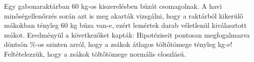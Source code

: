 Egy gabonaraktárban 60 kg-os kiszerelésben búzát csomagolnak. A havi
minőségellenőrzés során azt is meg akarták vizsgálni, hogy a raktárból 
kikerülő zsákokban tényleg 60 kg búza van-e, ezért lemértek 
darab véletlenül kiválasztott zsákot. Eredményül a következőket kapták:
Hipotéziseit pontosan megfogalmazva döntsön \%-os szinten arról, 
hogy a zsákok átlagos töltőtömege tényleg  kg-e! Feltételezzük, 
hogy a zsákok töltőtömege normális eloszlású.